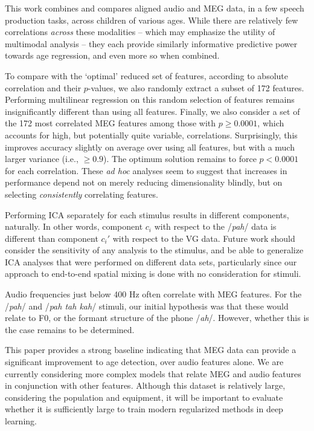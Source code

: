 \documentclass[utf8]{frontiersSCNS} %
\begin{document}

This work combines and compares aligned audio and MEG data, in a few speech production tasks, across children of various ages. While there are relatively few correlations {\em across} these modalities -- which may emphasize the utility of multimodal analysis -- they each provide similarly informative predictive power towards age regression, and even more so when combined.

To compare with the `optimal' reduced set of features, according to absolute correlation and their $p$-values, we also randomly extract a subset of 172 features. Performing multilinear regression on this random selection of features remains insignificantly different than using all features. Finally, we also consider a set of the 172 most correlated MEG features among those with $p \geq 0.0001$, which accounts for high, but potentially quite variable, correlations. Surprisingly, this improves accuracy slightly on average over using all features, but with a much larger variance (i.e., $\geq 0.9$). The optimum solution remains to force $p<0.0001$ for each correlation. These {\em ad hoc} analyses seem to suggest that increases in performance depend not on merely reducing dimensionality blindly, but on selecting {\em consistently} correlating features. %

Performing ICA separately for each stimulus results in different components, naturally. In other words, component $c_i$ with respect to the /{\em pah}/ data is different than component $c_i'$ with respect to the VG data. Future work should consider the sensitivity of any analysis to the stimulus, and be able to generalize ICA analyses that were performed on different data sets, particularly since our approach to end-to-end spatial mixing is done with no consideration for stimuli.

Audio frequencies just below 400 Hz often correlate with MEG features. For the /{\em pah}/ and /{\em pah tah kah}/ stimuli, our initial hypothesis was that these would relate to F0, or the formant structure of the phone /{\em ah}/. However, whether this is the case remains to be determined.

This paper provides a strong baseline indicating that MEG data can provide a significant improvement to age detection, over audio features alone. We are currently considering more complex models that relate MEG and audio features in conjunction with other features. Although this dataset is relatively large, considering the population and equipment, it will be important to evaluate whether it is sufficiently large to train modern regularized methods in deep learning.
\end{document}
